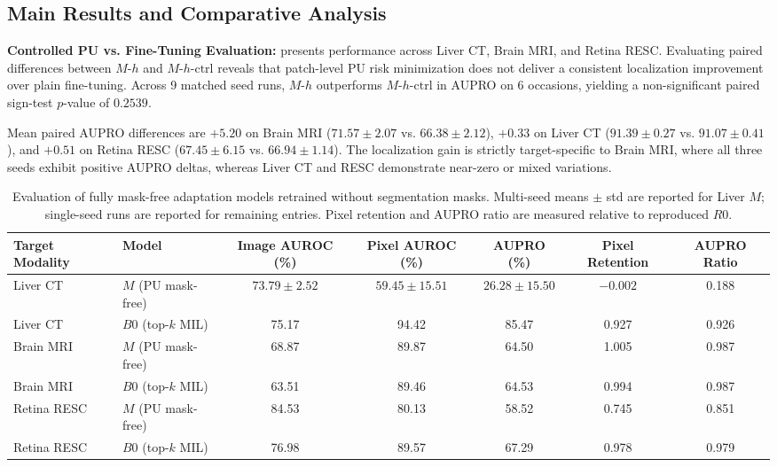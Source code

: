 \documentclass[10pt,twocolumn,letterpaper]{article}
\begin{document}
\subsection{Main Results and Comparative Analysis}

\noindent\textbf{Controlled PU vs. Fine-Tuning Evaluation:}  presents performance across Liver CT, Brain MRI, and Retina RESC. Evaluating paired differences between $M\text{-}h$ and $M\text{-}h\text{-ctrl}$ reveals that patch-level PU risk minimization does not deliver a consistent localization improvement over plain fine-tuning. Across 9 matched seed runs, $M\text{-}h$ outperforms $M\text{-}h\text{-ctrl}$ in AUPRO on 6 occasions, yielding a non-significant paired sign-test $p$-value of $0.2539$.

Mean paired AUPRO differences are $+5.20$ on Brain MRI ($71.57 \pm 2.07$ vs. $66.38 \pm 2.12$), $+0.33$ on Liver CT ($91.39 \pm 0.27$ vs. $91.07 \pm 0.41$), and $+0.51$ on Retina RESC ($67.45 \pm 6.15$ vs. $66.94 \pm 1.14$). The localization gain is strictly target-specific to Brain MRI, where all three seeds exhibit positive AUPRO deltas, whereas Liver CT and RESC demonstrate near-zero or mixed variations.

\begin{table}[t]
\centering
\small
\begin{tabular}{@{}llccccc@{}}
\toprule
\textbf{Target Modality} & \textbf{Model} & \textbf{Image AUROC (\%)} & \textbf{Pixel AUROC (\%)} & \textbf{AUPRO (\%)} & \textbf{Pixel Retention} & \textbf{AUPRO Ratio} \\
\midrule
Liver CT & $M$ (PU mask-free) & $73.79 \pm 2.52$ & $59.45 \pm 15.51$ & $26.28 \pm 15.50$ & $-0.002$ & 0.188 \\
Liver CT & $B0$ (top-$k$ MIL) & 75.17 & 94.42 & 85.47 & 0.927 & 0.926 \\
\midrule
Brain MRI & $M$ (PU mask-free) & 68.87 & 89.87 & 64.50 & 1.005 & 0.987 \\
Brain MRI & $B0$ (top-$k$ MIL) & 63.51 & 89.46 & 64.53 & 0.994 & 0.987 \\
\midrule
Retina RESC & $M$ (PU mask-free) & 84.53 & 80.13 & 58.52 & 0.745 & 0.851 \\
Retina RESC & $B0$ (top-$k$ MIL) & 76.98 & 89.57 & 67.29 & 0.978 & 0.979 \\
\bottomrule
\end{tabular}
\caption{Evaluation of fully mask-free adaptation models retrained without segmentation masks. Multi-seed means $\pm$ std are reported for Liver $M$; single-seed runs are reported for remaining entries. Pixel retention and AUPRO ratio are measured relative to reproduced $R0$.}
\label{tab:maskfree_results}
\end{table}
\end{document}
